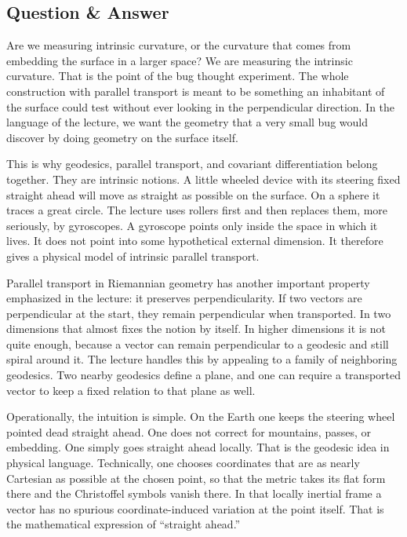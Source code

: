 \subsection{Question \& Answer}

Are we measuring intrinsic curvature, or the curvature that comes from embedding the surface in a larger space? We are measuring the intrinsic curvature. That is the point of the bug thought experiment. The whole construction with parallel transport is meant to be something an inhabitant of the surface could test without ever looking in the perpendicular direction. In the language of the lecture, we want the geometry that a very small bug would discover by doing geometry on the surface itself.

This is why geodesics, parallel transport, and covariant differentiation belong together. They are intrinsic notions. A little wheeled device with its steering fixed straight ahead will move as straight as possible on the surface. On a sphere it traces a great circle. The lecture uses rollers first and then replaces them, more seriously, by gyroscopes. A gyroscope points only inside the space in which it lives. It does not point into some hypothetical external dimension. It therefore gives a physical model of intrinsic parallel transport.

Parallel transport in Riemannian geometry has another important property emphasized in the lecture: it preserves perpendicularity. If two vectors are perpendicular at the start, they remain perpendicular when transported. In two dimensions that almost fixes the notion by itself. In higher dimensions it is not quite enough, because a vector can remain perpendicular to a geodesic and still spiral around it. The lecture handles this by appealing to a family of neighboring geodesics. Two nearby geodesics define a plane, and one can require a transported vector to keep a fixed relation to that plane as well.

Operationally, the intuition is simple. On the Earth one keeps the steering wheel pointed dead straight ahead. One does not correct for mountains, passes, or embedding. One simply goes straight ahead locally. That is the geodesic idea in physical language. Technically, one chooses coordinates that are as nearly Cartesian as possible at the chosen point, so that the metric takes its flat form there and the Christoffel symbols vanish there. In that locally inertial frame a vector has no spurious coordinate-induced variation at the point itself. That is the mathematical expression of ``straight ahead.''

